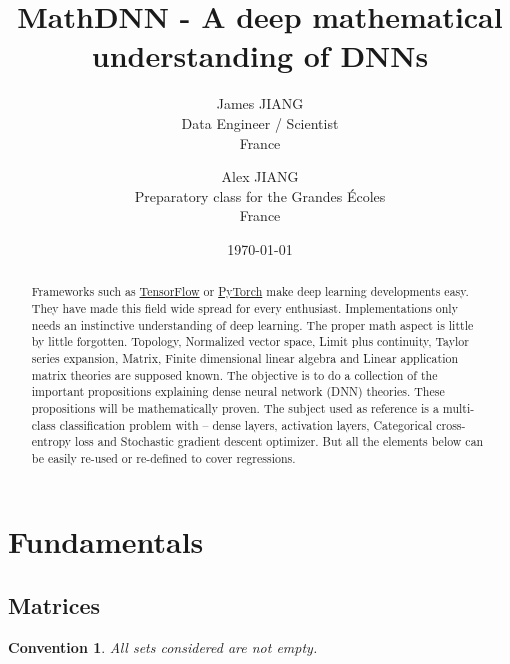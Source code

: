 \documentclass[11pt,en]{elegantpaper}
\title{MathDNN - A deep mathematical understanding of DNNs}
\author{James JIANG \\ Data Engineer / Scientist \\ France \and Alex JIANG \\ Preparatory class for the Grandes Écoles \\ France}
\institute{\href{https://github.com/iLoveDataJjia}{iLoveDataJjia Github}}
\date{\today}
\newtheorem{convention}{Convention}
\begin{document}
\maketitle

\begin{abstract}
  Frameworks such as \href{https://www.tensorflow.org/?hl=en}{TensorFlow} or \href{https://pytorch.org/}{PyTorch} make deep learning developments
  easy. They have made this field wide spread for every enthusiast. Implementations only needs an instinctive understanding of deep learning.
  The proper math aspect is little by little forgotten. Topology, Normalized vector space, Limit plus continuity, Taylor series expansion, Matrix,
  Finite dimensional linear algebra and Linear application matrix theories are supposed known. The objective is to do a collection of the
  important propositions explaining dense neural network (DNN) theories. These propositions will be mathematically proven. The subject used
  as reference is a multi-class classification problem with – dense layers, activation layers, Categorical cross-entropy loss and Stochastic
  gradient descent optimizer. But all the elements below can be easily re-used or re-defined to cover regressions.
\end{abstract}

\section{Fundamentals}

\subsection{Matrices}

\begin{convention}
  All sets considered are not empty.
\end{convention}
\end{document}
